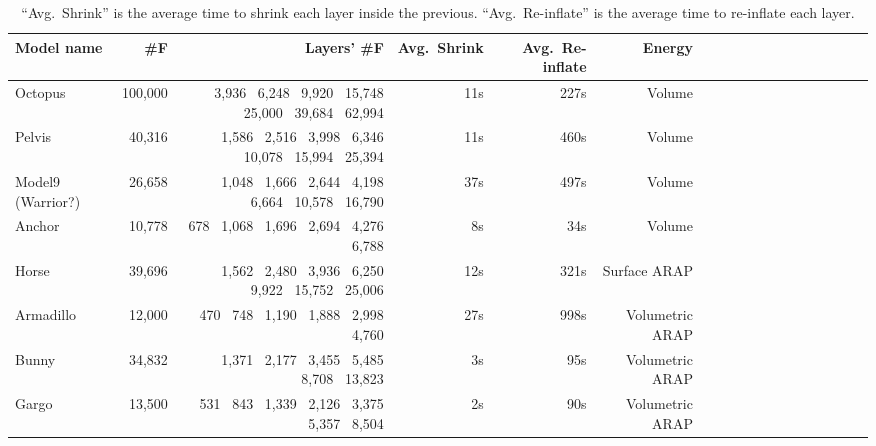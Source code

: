 \begin{table*}
\centering
{}
\setlength{\tabcolsep}{5.5pt}
\begin{tabular}{l r r r r r r r r r r r r r r r r r}
\rowcolor{white}
Model name  & \#F & Layers' \#F & Avg.\ Shrink & Avg.\ Re-inflate& Energy\\
\midrule
Octopus & 100,000 & 3,936 \ 6,248 \ 9,920 \ 15,748 \ 25,000 \ 39,684 \ 62,994 & 11s & 227s & Volume \\
Pelvis & 40,316 & 1,586 \ 2,516 \ 3,998 \ 6,346 \ 10,078 \ 15,994 \ 25,394 & 11s & 460s & Volume  \\
Model9 (Warrior?) & 26,658 & 1,048 \ 1,666 \ 2,644 \ 4,198 \ 6,664 \ 10,578 \ 16,790 & 37s & 497s & Volume  \\
Anchor & 10,778 & 678 \ 1,068 \ 1,696 \ 2,694 \ 4,276 \ 6,788 & 8s & 34s & Volume \\
Horse & 39,696 & 1,562 \ 2,480 \ 3,936 \ 6,250 \ 9,922 \ 15,752 \ 25,006 & 12s & 321s & Surface ARAP \\
Armadillo & 12,000 & 470 \ 748 \ 1,190 \ 1,888 \ 2,998 \ 4,760 & 27s & 998s & Volumetric ARAP \\
Bunny & 34,832 & 1,371 \ 2,177 \ 3,455 \ 5,485 \ 8,708 \ 13,823 & 3s & 95s & Volumetric ARAP \\
Gargo & 13,500 & 531 \ 843 \ 1,339 \ 2,126 \ 3,375 \ 5,357 \ 8,504 & 2s & 90s & Volumetric ARAP\\
\bottomrule
\end{tabular}
\caption{
``Avg.\ Shrink'' is the average time to shrink each layer inside the previous.
``Avg.\ Re-inflate'' is the average time to re-inflate each layer.
}
\label{tab:timings}
\end{table*}
